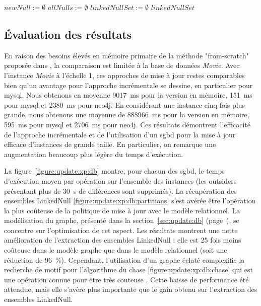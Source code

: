 \begin{algorithm}[ht]
	\caption{$\textsc{FindLinkedNull}(\mathcal{D}, NullBucket)$}
    \label{algo:update:mysql:partition}
	$newNull := \emptyset$ \;
    $allNulls := \emptyset$ \;
    $linkedNullSet := \emptyset$ \;
	\Return $linkedNullSet$ \;
\end{algorithm}

\subsection{Évaluation des résultats}
En raison des besoins élevés en mémoire primaire de la méthode "from-scratch" proposée dans \cite{chabinConsistentUpdatingDatabases2020}, la comparaison est limitée à la base de données \textit{Movie}.
Avec l'instance \textit{Movie} à l'échelle 1, ces approches de mise à jour restes comparables bien qu'un avantage pour l'approche incrémentale se dessine, en particulier pour \gls{mysql}.
Nous obtenons en moyenne \SI{9017}{\ms} pour la version en mémoire, \SI{151}{\ms} pour \gls{mysql} et \SI{2380}{\ms} pour \gls{neo4j}.
En considérant une instance cinq fois plus grande, nous obtenons une moyenne de \SI{888966}{\ms} pour la version en mémoire, \SI{595}{\ms} pour \gls{mysql} et \SI{2706}{\ms} pour \gls{neo4j}.
Ces résultats démontrent l'efficacité de l'approche incrémentale et de l'utilisation d'un \gls{sgbd} pour la mise à jour efficace d'instances de grande taille.
En particulier, on remarque une augmentation beaucoup plus légère du temps d'exécution.

La figure~\ref{figure:update:xp:db} montre, pour chacun des \gls{sgbd}, le temps d'exécution moyen par opération sur l'ensemble des instances (les outsiders présentant plus de \SI{30}{\s} de différences sont supprimés).
La récupération des ensembles \textsf{LinkedNull} \ref{figure:update:xp:db:partitions} s'est avérée être l'opération la plus coûteuse de la politique de mise à jour avec le modèle relationnel.
La modélisation du graphe, présenté dans la section~\ref{sec:update:db} (page~\pageref{sec:update:db}), se concentre sur l'optimisation de cet aspect.
Les résultats montrent une nette amélioration de l'extraction des ensembles \textsf{LinkedNull} : elle est \num{25} fois moins coûteuse dans le modèle graphe que dans le modèle relationnel (soit une réduction de \SI{96}{\percent}).
Cependant, l'utilisation d'un graphe éclaté complexifie la recherche de motif pour l'algorithme du \gls{chase} \ref{figure:update:xp:db:chase} qui est une opération connue pour être très couteuse \cite{}.
Cette baisse de performance été attendue, mais elle s'avère plus importante que le gain obtenu sur l'extraction des ensembles \textsf{LinkedNull}.

